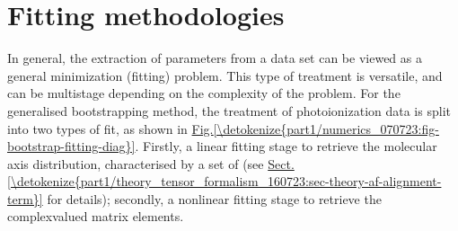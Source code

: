 \documentclass[letterpaper,table,10pt,english]{jupyterBook}
\begin{document}
\section{Fitting methodologies}
\label{\detokenize{part1/numerics_070723:fitting-methodologies}}\label{\detokenize{part1/numerics_070723:sec-numerics-fitting-methodologies}}
\sphinxAtStartPar
In general, the extraction of parameters from a data set can be viewed as a general minimization (fitting) problem. This type of treatment is versatile, and can be multi\sphinxhyphen{}stage depending on the complexity of the problem. For the generalised bootstrapping method, the treatment of photoionization data is split into two types of fit, as shown in \hyperref[\detokenize{part1/numerics_070723:fig-bootstrap-fitting-diag}]{Fig.\@ \ref{\detokenize{part1/numerics_070723:fig-bootstrap-fitting-diag}}}. Firstly, a linear fitting stage to retrieve the molecular axis distribution, characterised by a set of {\hyperref[\detokenize{backmatter/glossary:term-ADMs}]{}} (see \hyperref[\detokenize{part1/theory_tensor_formalism_160723:sec-theory-af-alignment-term}]{Sect.\@ \ref{\detokenize{part1/theory_tensor_formalism_160723:sec-theory-af-alignment-term}}} for details); secondly, a non\sphinxhyphen{}linear fitting stage to retrieve the complex\sphinxhyphen{}valued matrix elements.
\end{document}
